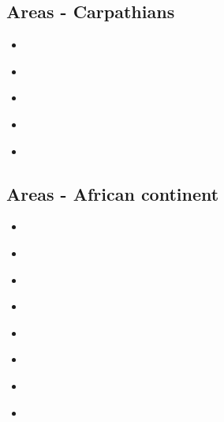 \subsection{Areas - Carpathians}

\begin{scriptsize}
\begin{itemize}
\item[\twothousand]
\textcite{wosp00} \\
\item[\twothousandfour]
\textcite{clbm04} \\
\item[\twothousandfive]
\textcite{isms05} \\
\item[\twothousandsix]
\textcite{nehe06} \\
\item[\twothousandnineteen]
\textcite{sepg19} \\
\end{itemize}
\end{scriptsize}

\subsection{Areas - African continent}

\begin{scriptsize}
\begin{itemize}
\item[\nineteenninetyfour]
\textcite{gikb94} \\
\item[\nineteenninetynine]
\textcite{pymi99} \\
\item[\twothousandeleven]
\textcite{vabt11} \\
\item[\twothousandtwelve]
\textcite{busm12} \\
\item[\twothousandfourteen]
\textcite{gagb14} \\
\item[\twothousandseventeen]
\textcite{wakc17} \\
\item[\twothousandeighteen]
\textcite{gusb18} \\
\item[\twothousandtwenty]
\textcite{cels20} \\
\end{itemize}
\end{scriptsize}

